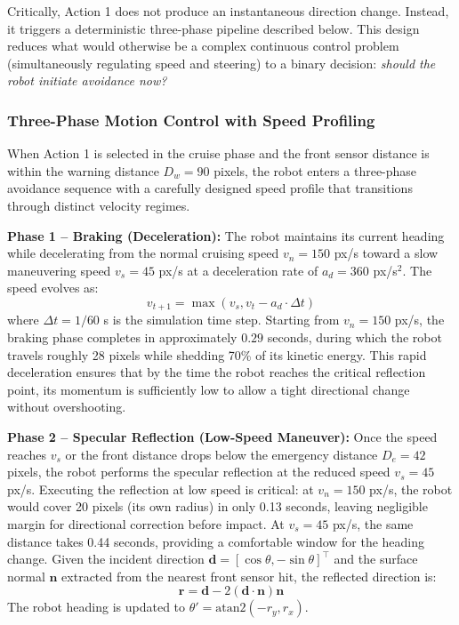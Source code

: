\documentclass[conference]{IEEEtran}
\begin{document}
Critically, Action 1 does not produce an instantaneous direction change. Instead, it triggers a deterministic three-phase pipeline described below. This design reduces what would otherwise be a complex continuous control problem (simultaneously regulating speed and steering) to a binary decision: \emph{should the robot initiate avoidance now?}

\subsubsection{Three-Phase Motion Control with Speed Profiling}

When Action 1 is selected in the cruise phase and the front sensor distance is within the warning distance $D_w = 90$ pixels, the robot enters a three-phase avoidance sequence with a carefully designed speed profile that transitions through distinct velocity regimes.

\textbf{Phase 1 -- Braking (Deceleration):} The robot maintains its current heading while decelerating from the normal cruising speed $v_n = 150$ px/s toward a slow maneuvering speed $v_s = 45$ px/s at a deceleration rate of $a_d = 360$ px/s$^2$. The speed evolves as:
\begin{equation}
    v_{t+1} = \max(v_s, v_t - a_d \cdot \Delta t)
\end{equation}
where $\Delta t = 1/60$ s is the simulation time step. Starting from $v_n = 150$ px/s, the braking phase completes in approximately $0.29$ seconds, during which the robot travels roughly 28 pixels while shedding 70\% of its kinetic energy. This rapid deceleration ensures that by the time the robot reaches the critical reflection point, its momentum is sufficiently low to allow a tight directional change without overshooting.

\textbf{Phase 2 -- Specular Reflection (Low-Speed Maneuver):} Once the speed reaches $v_s$ or the front distance drops below the emergency distance $D_e = 42$ pixels, the robot performs the specular reflection at the reduced speed $v_s = 45$ px/s. Executing the reflection at low speed is critical: at $v_n = 150$ px/s, the robot would cover 20 pixels (its own radius) in only 0.13 seconds, leaving negligible margin for directional correction before impact. At $v_s = 45$ px/s, the same distance takes 0.44 seconds, providing a comfortable window for the heading change. Given the incident direction $\mathbf{d} = [\cos\theta, -\sin\theta]^\top$ and the surface normal $\mathbf{n}$ extracted from the nearest front sensor hit, the reflected direction is:
\begin{equation}
    \mathbf{r} = \mathbf{d} - 2(\mathbf{d} \cdot \mathbf{n})\mathbf{n}
\end{equation}
The robot heading is updated to $\theta' = \text{atan2}(-r_y, r_x)$.
\end{document}
